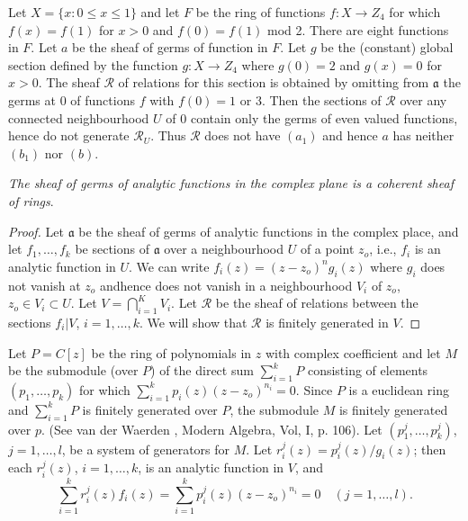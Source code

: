 \begin{exam}%
Let $X = \{ x : 0 \le x \le 1\}$ and let $F$ be the ring of functions
$f : X \rightarrow Z_4 $ for which $f(x) = f(1)$ for $x > 0$ and $f(0)
= f(1)$ mod 2. There are eight functions in $F$. Let $a$ be the
sheaf of germs of function in $F$. Let $g$ be the (constant) global
section defined by the function $g : X \rightarrow Z_4$ where $g(0) =
2$ and $g(x) = 0$ for $x > 0$. The sheaf $\mathscr{R}$ of relations
for this section is obtained by omitting from $\mathfrak{a}$ the germs at 0 of
functions $f$ with $f(0) = 1$ or 3. Then the sections of $\mathscr{R}$
over any connected neighbourhood $U$ of 0 contain only the germs of
even valued functions, hence do not generate $\mathscr{R}_U$. Thus
$\mathscr{R}$ does not have $(a_1)$ and hence $a$ has neither $(b_1)$
nor $(b)$. 
\end{exam}

\textit{The sheaf of germs of analytic functions in the complex plane
  is a coherent sheaf of rings}. 

\begin{proof}
Let $\mathfrak{a}$ be the sheaf of germs of analytic functions in the complex
place, and let $f_1, \ldots , f_k$ be sections of $\mathfrak{a}$ over a
neighbourhood $U$ of a point $z_o$, i.e., $f_i$ is an analytic function
in $U$. We can write $f_i(z) = (z - z_o)^n g_i (z)$ where $g_i$ does not
vanish at $z_o$ and\pageoriginale hence does not vanish in a
neighbourhood $V_i$ of 
$z_o$, $z_o \in V_i \subset U$. Let $V = \bigcap^K_{i = 1} V_i$. Let
$\mathscr{R}$ be the sheaf of relations between the sections $f_i | V$,
$i = 1, \ldots , k$. We will show that $\mathscr{R}$ is finitely
generated in $V$. 
 \end{proof}
 
 Let $P = C[z]$ be the ring of polynomials in $z$ with complex
 coefficient and let $M$ be the submodule (over $P$) of the direct sum
 $\sum^k_{i=1} P$ consisting of elements $(p_1 , \ldots , p_k)$ for
 which $\sum^k_{i=1} p_i (z) (z - z_o)^{n_i} = 0$. Since $P$ is a
 euclidean ring and $\sum^k_{i=1} P$ is finitely generated over $P$,
 the submodule $M$ is finitely generated over $p$. (See van der
 Waerden , Modern Algebra, Vol, I, p. 106). Let $(p^j_1, \ldots ,
 p^j_k)$, $j = 1, \ldots , l$, be a system of generators for $M$. Let
 $r^j_i(z) = p^j_i(z) / g_i(z)$; then each $r^j_i(z)$, $i = 1, \ldots,
 k$, is an analytic function in $V$, and  
 $$
 \sum^k_{i=1} r^j_i(z) f_i (z) = \sum^k_{i=1} p^j_i(z)  (z -
 z_o)^{n_i} = 0 \quad (j = 1, \ldots , l). 
 $$
 
